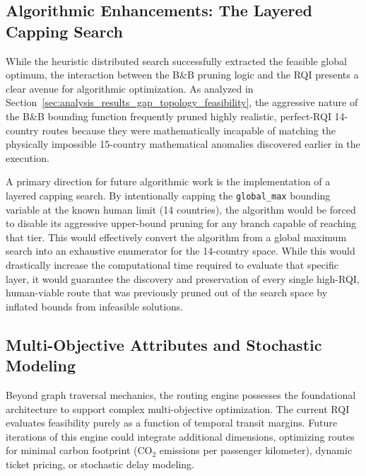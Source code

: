 \subsection{Algorithmic Enhancements: The Layered Capping Search}
\label{subsec:algorithmic_enhancements_layered_capping}

While the heuristic distributed search successfully extracted the feasible global optimum, the interaction between the B\&B pruning logic and the RQI presents a clear avenue for algorithmic optimization. As analyzed in Section~\ref{sec:analysis_results_gap_topology_feasibility}, the aggressive nature of the B\&B bounding function frequently pruned highly realistic, perfect-RQI 14-country routes because they were mathematically incapable of matching the physically impossible 15-country mathematical anomalies discovered earlier in the execution.

\medskip

A primary direction for future algorithmic work is the implementation of a layered capping search. By intentionally capping the \texttt{global\_max} bounding variable at the known human limit (14 countries), the algorithm would be forced to disable its aggressive upper-bound pruning for any branch capable of reaching that tier. This would effectively convert the algorithm from a global maximum search into an exhaustive enumerator for the 14-country space. While this would drastically increase the computational time required to evaluate that specific layer, it would guarantee the discovery and preservation of every single high-RQI, human-viable route that was previously pruned out of the search space by inflated bounds from infeasible solutions.

\subsection{Multi-Objective Attributes and Stochastic Modeling}
\label{subsec:multiobjective_stochastic_modeling}

Beyond graph traversal mechanics, the routing engine possesses the foundational architecture to support complex multi-objective optimization. The current RQI evaluates feasibility purely as a function of temporal transit margins. Future iterations of this engine could integrate additional dimensions, optimizing routes for minimal carbon footprint ($\mathrm{CO_2}$ emissions per passenger kilometer), dynamic ticket pricing, or stochastic delay modeling.

\medskip

